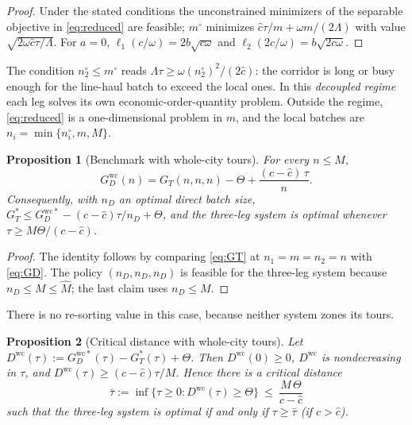 \documentclass[10pt, reqno]{amsart}
\newtheorem{proposition}{Proposition}
\theoremstyle{definition}
\begin{document}
\begin{proof}
Under the stated conditions the unconstrained minimizers of the separable objective in \eqref{eq:reduced} are feasible; $m^\circ$ minimizes $\hat c\tau/m+\omega m/(2\Lambda)$ with value $\sqrt{2\omega\hat c\tau/\Lambda}$. For $a=0$, $\ell_1(c/\omega)=2b\sqrt{c\omega}$ and $\ell_2(2c/\omega)=b\sqrt{2c\omega}$.
\end{proof}

The condition $n_2^\circ\le m^\circ$ reads $\Lambda\tau\ge\omega (n_2^\circ)^2/(2\hat c)$: the corridor is long or busy enough for the line-haul batch to exceed the local ones. In this \emph{decoupled regime} each leg solves its own economic-order-quantity problem. Outside the regime, \eqref{eq:reduced} is a one-dimensional problem in $m$, and the local batches are $n_i=\min\{n_i^\circ,m,M\}$.

\begin{proposition}[Benchmark with whole-city tours]\label{prop:identity}
For every $n\le M$,
\begin{equation}\label{eq:identity}
G_D^{\mathrm{wc}}(n)=G_T(n,n,n)-\Theta+\frac{(c-\hat c)\,\tau}{n}.
\end{equation}
Consequently, with $n_D$ an optimal direct batch size, $G_T^*\le G_D^{\mathrm{wc}*}-(c-\hat c)\tau/n_D+\Theta$, and the three-leg system is optimal whenever $\tau\ge M\Theta/(c-\hat c)$.
\end{proposition}

\begin{proof}
The identity follows by comparing \eqref{eq:GT} at $n_1=m=n_2=n$ with \eqref{eq:GD}. The policy $(n_D,n_D,n_D)$ is feasible for the three-leg system because $n_D\le M\le\hat M$; the last claim uses $n_D\le M$.
\end{proof}

There is no re-sorting value in this case, because neither system zones its tours.

\begin{proposition}[Critical distance with whole-city tours]\label{prop:critical}
Let $D^{\mathrm{wc}}(\tau):=G_D^{\mathrm{wc}*}(\tau)-G_T^*(\tau)+\Theta$. Then $D^{\mathrm{wc}}(0)\ge 0$, $D^{\mathrm{wc}}$ is nondecreasing in $\tau$, and $D^{\mathrm{wc}}(\tau)\ge(c-\hat c)\tau/M$. Hence there is a critical distance
\[
\bar\tau:=\inf\{\tau\ge0: D^{\mathrm{wc}}(\tau)\ge\Theta\}\ \le\ \frac{M\,\Theta}{c-\hat c}
\]
such that the three-leg system is optimal if and only if $\tau\ge\bar\tau$ (if $c>\hat c$).
\end{proposition}
\end{document}
